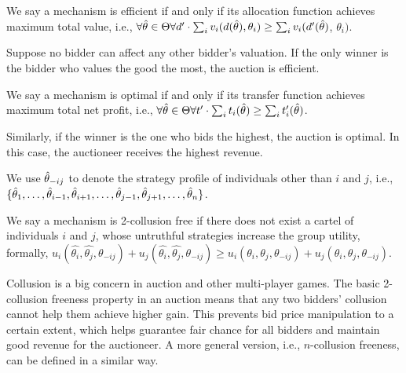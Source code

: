 \begin{definition}[Efficiency]
	We say a mechanism is efficient if and only if its allocation function achieves maximum total
	value, i.e., $\forall \hat{\theta} \in \Theta \forall d' \cdot \sum_{i} v_{i}(d(\hat{\theta}), \theta_{i})
	\geq \sum_{i} v_{i}(d'(\hat{\theta})$, $\theta_{i})$.
\end{definition}

Suppose no bidder can affect any other bidder's valuation.
If the only winner is the bidder who values the good the most, the auction is efficient.

\begin{definition}[Optimality]
	We say a mechanism is optimal if and only if its transfer function achieves maximum total net
	profit, i.e., $\forall \hat{\theta} \in \Theta \forall t' \cdot \sum_i t_i(\hat{\theta}) \geq
	\sum_i t_i'(\hat{\theta})$.
\end{definition}

Similarly, if the winner is the one who bids the highest, the auction is optimal.
In this case, the auctioneer receives the highest revenue.

We use $\hat{\theta}_{-ij}$ to denote the strategy profile of individuals other than $i$ and $j$, i.e.,
$\{\hat{\theta}_1, \allowbreak \ldots, \allowbreak \hat{\theta}_{i-1}, \allowbreak \hat{\theta}_{i+1}, \ldots,
\hat{\theta}_{j-1}, \hat{\theta}_{j+1}, \allowbreak \dots, \hat{\theta}_n\}$.

\begin{definition}
	We say a mechanism is 2-collusion free if there does not exist a cartel of individuals $i$ and
	$j$, whose untruthful strategies increase the group utility, formally,
	$u_i(\hat{\theta_i}, \allowbreak \hat{\theta_j}, \allowbreak \theta_{-ij}) + u_j(\hat{\theta_i},
	\hat{\theta_j},\theta_{-ij}) \geq u_i(\theta_i, \allowbreak \theta_j, \allowbreak \theta_{-ij}) +
	u_j(\theta_i, \theta_j, \theta_{-ij})$.
\end{definition}
Collusion is a big concern in auction and other multi-player games.
The basic 2-collusion freeness property in an auction means that any two bidders' collusion cannot
help them achieve higher gain.
This prevents bid price manipulation to a certain extent, which helps guarantee fair chance for all
bidders and maintain good revenue for the auctioneer.
A more general version, i.e., $n$-collusion freeness, can be defined in a similar way.

